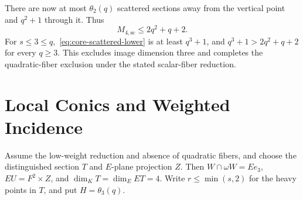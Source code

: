 \documentclass[12pt,letterpaper,onecolumn]{article}
\theoremstyle{definition}
\theoremstyle{remark}
\begin{document}
There are now at most \(\theta_2(q)\) scattered sections away from the vertical point and \(q^2+1\) through it. Thus
\[
M_{4,\mathrm{sc}}\le2q^2+q+2.
\]
For \(s\le3\le q\),~\eqref{eq:core-scattered-lower} is at least \(q^3+1\), and
\(q^3+1>2q^2+q+2\) for every \(q\ge3\). This excludes image dimension three and completes the quadratic-fiber exclusion under the stated scalar-fiber reduction.

\section{Local Conics and Weighted Incidence}
Assume the low-weight reduction and absence of quadratic fibers, and choose the distinguished section \(T\) and \(E\)-plane projection \(Z\).
Then \(W\cap\omega W=Ee_3\), \(EU=F^2\times Z\), and \(\dim_KT=\dim_EET=4\).
Write \(r\le\min(s,2)\) for the heavy points in \(T\), and put \(H=\theta_3(q)\).
\end{document}
